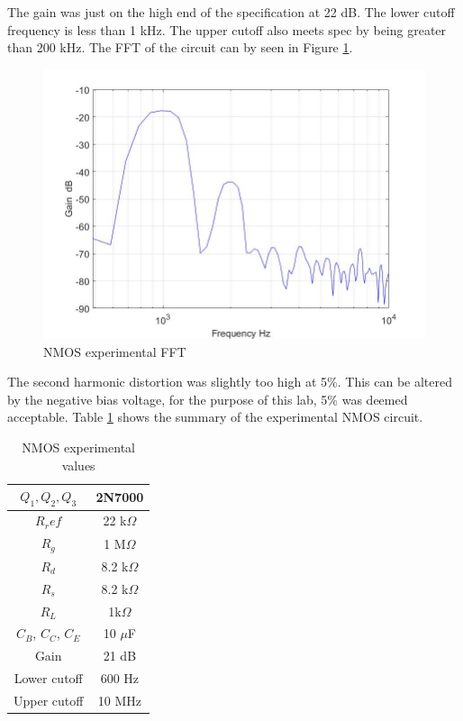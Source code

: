 The gain was just on the high end of the specification at 22 dB. The lower cutoff frequency is less than 1 kHz. The upper cutoff also meets spec by being greater than 200 kHz. The FFT of the circuit can by seen in Figure \ref{fig:nmosexpfft}.

\begin{figure}[H]
	\centering
	\includegraphics[width=0.7\linewidth]{ExperimentalImplementation/nmos_fft.jpg}
	\caption{NMOS experimental FFT}
	\label{fig:nmosexpfft}
\end{figure}

The second harmonic distortion was slightly too high at 5\%. This can be altered by the negative bias voltage, for the purpose of this lab, 5\% was deemed acceptable. Table \ref{tab:nmosexp} shows the summary of the experimental NMOS circuit.


\begin{table}[H]
	\centering
	\caption{NMOS experimental values}
	\label{tab:nmosexp}
	\begin{tabular}{cc}
		$Q_1, Q_2, Q_3$ & 2N7000        \\ \hline
		$R_ref$         & 22 k$\Omega$ \\ \hline
		$R_g$           & 1 M$\Omega$  \\ \hline
		$R_d$           & 8.2 k$\Omega$   \\ \hline
		$R_s$           & 8.2 k$\Omega$  \\ \hline
		$R_L$           & 1k$\Omega$    \\ \hline
		$C_B$, $C_C$, $C_E$ & 10 $\mu$F         \\ \hline   
		Gain            & 21 dB   \\   \hline
		Lower cutoff    & 600 Hz \\ \hline
		Upper cutoff    & 10  MHz \\ \hline
	\end{tabular}
\end{table}

